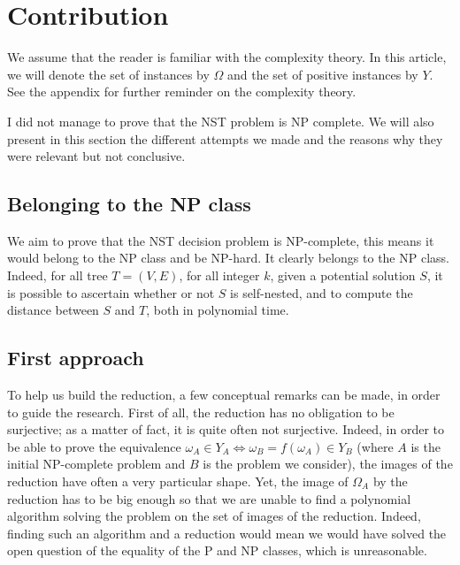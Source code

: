 \newcommand\variable{\emph{variable}\xspace}
\newcommand\variables{\emph{variables}\xspace}
\newcommand\widget{\emph{widget}\xspace}
\newcommand\widgets{\emph{widgets}\xspace}
\newcommand\constraint{\emph{constraint}\xspace}
\newcommand\constraints{\emph{constraints}\xspace}
\newcommand\Variable{\emph{Variable}\xspace}
\newcommand\Variables{\emph{Variables}\xspace}
\newcommand\Widget{\emph{Widget}\xspace}
\newcommand\Widgets{\emph{Widgets}\xspace}
\newcommand\Constraint{\emph{Constraint}\xspace}
\newcommand\Constraints{\emph{Constraints}\xspace}

\section{Contribution}

We assume that the reader is familiar with the complexity theory. In
this article, we will denote the set of instances by $\Omega$ and the
set of positive instances by $Y$. See the appendix for further
reminder on the complexity theory.

I did not manage to prove that the NST problem is NP complete. We will
also present in this section the different attempts we made and the
reasons why they were relevant but not conclusive. 

\subsection{Belonging to the NP class}

We aim to prove that the NST decision problem is NP-complete, this
means it would belong to the NP class and be NP-hard. It
clearly belongs to the NP class. Indeed, for all tree $T = (V,E)$, for
all integer $k$, given a potential solution $S$, it is possible to
ascertain whether or not $S$ is self-nested, and to compute the
distance between $S$ and $T$, both in polynomial time.

\noindent\hrulefill

\subsection{First approach}
To help us build the reduction, a few conceptual remarks can be made,
in order to guide the research. First of all, the reduction has no
obligation to be surjective; as a matter of fact, it is quite often
not surjective. Indeed, in order to be able to prove the equivalence
$\omega_{A} \in Y_{A} \Leftrightarrow \omega_{B} = f(\omega_{A}) \in
Y_{B}$
(where $A$ is the initial NP-complete problem and $B$ is the problem
we consider), the images of the reduction have often a very
particular shape. Yet, the image of $\Omega_{A}$ by the reduction has
to be big enough so that we are unable to find a polynomial algorithm
solving the problem on the set of images of the reduction. Indeed,
finding such an algorithm and a reduction would mean we would have
solved the open question of the equality of the P and NP classes,
which is unreasonable.

